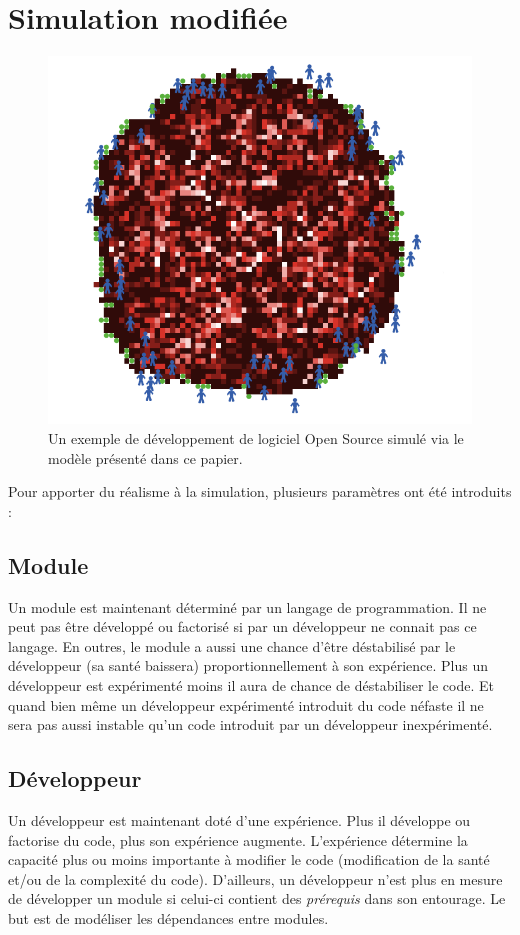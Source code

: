 \documentclass{article}
\begin{document}
\section{Simulation modifiée}

\begin{figure}[H]
 \centerline{\includegraphics[scale=0.45]{pictures/Image1.png}}
\caption{Un exemple de développement de logiciel Open Source
  simulé via le modèle présenté dans ce papier.}
 \end{figure}

Pour apporter du réalisme à la simulation, plusieurs paramètres ont été introduits :

\subsection{Module}
Un module est maintenant déterminé par un langage de programmation. Il ne peut pas être développé ou factorisé si par un développeur ne connait pas ce langage. En outres, le module a aussi une chance d'être déstabilisé par le développeur (sa santé baissera) proportionnellement à son expérience. Plus un développeur est expérimenté moins il aura de chance de déstabiliser le code. Et quand bien même un développeur expérimenté introduit du code néfaste il ne sera pas aussi instable qu'un code introduit par un développeur inexpérimenté.

\newpage
\subsection{Développeur}
Un développeur est maintenant doté d'une expérience. Plus il développe ou factorise du code, plus son expérience augmente. L'expérience détermine la capacité plus ou moins importante à modifier le code (modification de la santé et/ou de la complexité du code). 
D'ailleurs, un développeur n'est plus en mesure de développer un module si celui-ci contient des \textit{prérequis} dans son entourage. Le but est de modéliser les dépendances entre modules.
\\
\end{document}
